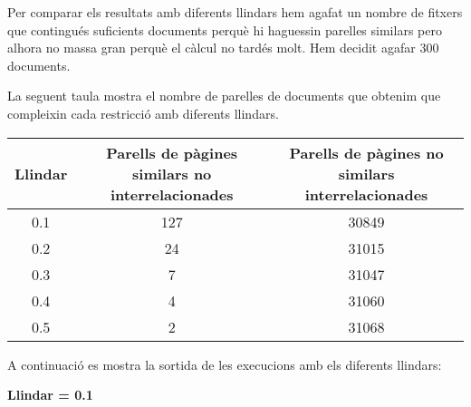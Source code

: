 \documentclass{report}
\begin{document}
Per comparar els resultats amb diferents llindars hem agafat un nombre de fitxers que contingués suficients documents perquè hi haguessin parelles similars pero alhora no massa gran perquè el càlcul no tardés molt. Hem decidit agafar 300 documents.

La seguent taula mostra el nombre de parelles de documents que obtenim que compleixin cada restricció amb diferents llindars.


\begin{center}
    \begin{tabular}{| c | c | c |}
    \hline
    Llindar & Parells de pàgines similars no interrelacionades & Parells de pàgines no similars interrelacionades \\ \hline
    0.1 & 127 & 30849 \\ \hline
    0.2 & 24  & 31015 \\ \hline
    0.3 & 7   & 31047 \\ \hline
    0.4 & 4   & 31060 \\ \hline
    0.5 & 2   & 31068 \\
    \hline
    \end{tabular}
\end{center}

A continuació es mostra la sortida de les execucions amb els diferents llindars:
\newline
\newline
\centerline{ \textbf{Llindar = 0.1} }
\end{document}
